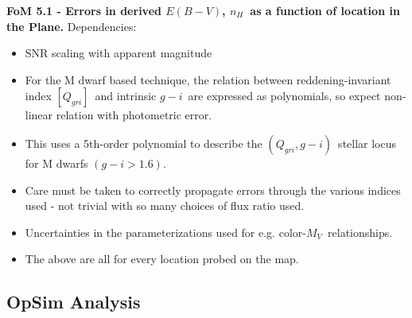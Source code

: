 {\bf FoM 5.1 - Errors in derived $E(B-V)$, $n_H$~as a function of
  location in the Plane.}
Dependencies:
\begin{itemize}
  \item SNR scaling with apparent magnitude
    \item For the M dwarf based technique, the relation between
      reddening-invariant index $[Q_{gri}]$~and intrinsic $g-i$~are
      expressed as polynomials, so expect non-linear relation with
      photometric error.  
      \item This uses a 5th-order polynomial to describe the
        $(Q_{gri}, g-i)$~stellar locus for M dwarfs $(g-i > 1.6)$.
        \item Care must be taken to correctly propagate errors through
          the various indices used - not trivial with so many choices
          of flux ratio used.
          \item Uncertainties in the parameterizations used for e.g. color-$M_V$~relationships.
            \item The above are all for every location probed on the map.
\end{itemize}


\subsection{OpSim Analysis}
\label{sec:\secname:MW_Disk_analysis}


